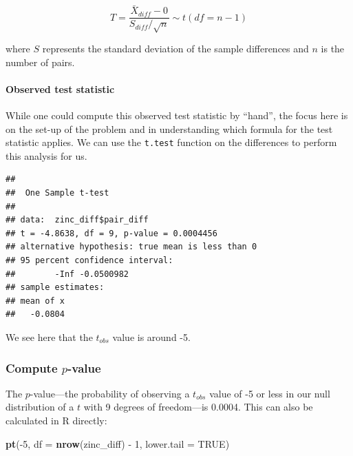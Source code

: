 \documentclass[]{tufte-book}
\newenvironment{Shaded}{\begin{snugshade}}{\end{snugshade}}
\newcommand{\KeywordTok}[1]{\textcolor[rgb]{0.13,0.29,0.53}{\textbf{{#1}}}}
\newcommand{\DataTypeTok}[1]{\textcolor[rgb]{0.13,0.29,0.53}{{#1}}}
\newcommand{\DecValTok}[1]{\textcolor[rgb]{0.00,0.00,0.81}{{#1}}}
\newcommand{\StringTok}[1]{\textcolor[rgb]{0.31,0.60,0.02}{{#1}}}
\newcommand{\OtherTok}[1]{\textcolor[rgb]{0.56,0.35,0.01}{{#1}}}
\newcommand{\NormalTok}[1]{{#1}}
\begin{document}
\[ T =\dfrac{ \bar{X}_{diff} - 0}{ S_{diff} / \sqrt{n} } \sim t (df = n - 1) \]

where \(S\) represents the standard deviation of the sample differences
and \(n\) is the number of pairs.

\paragraph{Observed test statistic}\label{observed-test-statistic-4}

While one could compute this observed test statistic by ``hand'', the
focus here is on the set-up of the problem and in understanding which
formula for the test statistic applies. We can use the \texttt{t.test}
function on the differences to perform this analysis for us.

\begin{Shaded}
\end{Shaded}

\begin{verbatim}
## 
##  One Sample t-test
## 
## data:  zinc_diff$pair_diff
## t = -4.8638, df = 9, p-value = 0.0004456
## alternative hypothesis: true mean is less than 0
## 95 percent confidence interval:
##        -Inf -0.0500982
## sample estimates:
## mean of x 
##   -0.0804
\end{verbatim}

We see here that the \(t_{obs}\) value is around -5.

\subsubsection{\texorpdfstring{Compute
\(p\)-value}{Compute p-value}}\label{compute-p-value-3}

The \(p\)-value---the probability of observing a \(t_{obs}\) value of -5
or less in our null distribution of a \(t\) with 9 degrees of
freedom---is 0.0004. This can also be calculated in R directly:

\begin{Shaded}
\begin{Highlighting}[]
\KeywordTok{pt}\NormalTok{(-}\DecValTok{5}\NormalTok{, }\DataTypeTok{df =} \KeywordTok{nrow}\NormalTok{(zinc_diff) -}\StringTok{ }\DecValTok{1}\NormalTok{, }\DataTypeTok{lower.tail =} \OtherTok{TRUE}\NormalTok{)}
\end{Highlighting}
\end{Shaded}
\end{document}
